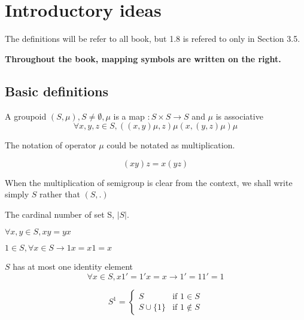 \section[1]{Introductory ideas}
The definitions will be refer to all book, but 1.8 is refered to only in Section 3.5.

\textbf{Throughout the book, mapping symbols are written on the right.}

\subsection[1]{Basic definitions}

\begin{Def}[Semigroup]
    A groupoid $(S,\mu), S \neq \emptyset, \mu$ is a map $: S\times S \to S$ and $\mu$ is associative
    \begin{equation}
        \forall x,y,z \in S, ((x,y)\mu,z)\mu (x,(y,z)\mu)\mu
    \end{equation}
\end{Def}

The notation of operator $\mu$ could be notated as multiplication.

$$(x y)z=x(y z)$$

When the multiplication of semigroup is clear from the context, we shall write simply $S$ rather that $(S,.)$

\begin{Def}
    The cardinal number of set S, $|S|$.
\end{Def}

\begin{Def}
    $\forall x,y \in S, x y = y x$
\end{Def}

\begin{Def}[Identity]
    $1\in S, \forall x \in S \to 1x=x1=x $
\end{Def}

$S$ has at most one identity element
$$\forall x \in S, x1'=1'x=x \to 1'=11' =1$$


\begin{Rmk}[$S^{1}$]
    \[
        S^1 =
        \begin{cases}
            S               &   \text{if } 1 \in S  \\
            S \cup \{1\}    &   \text{if } 1 \notin S
        \end{cases}
    \]
    
\end{Rmk}

